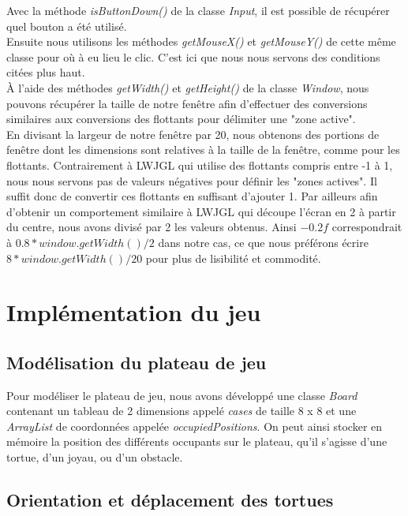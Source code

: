 \documentclass{article}
\begin{document}
Avec la méthode \textit{isButtonDown()} de la classe \textit{Input}, il est possible de récupérer quel bouton a été utilisé. \\

Ensuite nous utilisons les méthodes \textit{getMouseX()} et \textit{getMouseY()} de cette même classe pour où à eu lieu le clic. C'est ici que nous nous servons des conditions citées plus haut. \\

À l'aide des méthodes \textit{getWidth()} et \textit{getHeight()} de la classe \textit{Window}, nous pouvons récupérer la taille de notre fenêtre afin d'effectuer des conversions similaires aux conversions des flottants pour délimiter une "zone active".  \\

En divisant la largeur de notre fenêtre par 20, nous obtenons des portions de fenêtre dont les dimensions sont relatives à la taille de la fenêtre, comme pour les flottants. Contrairement à LWJGL qui utilise des flottants compris entre -1 à 1, nous nous servons pas de valeurs négatives pour définir les "zones actives".  Il suffit donc de convertir ces flottants en suffisant d'ajouter 1. Par ailleurs afin d'obtenir un comportement similaire à LWJGL qui découpe l'écran en 2 à partir du centre, nous avons divisé par 2 les valeurs obtenus. Ainsi $-0.2f$ correspondrait à $0.8*window.getWidth()/2$ dans notre cas, ce que nous préférons écrire $8*window.getWidth()/20$ pour plus de lisibilité et commodité.

\newpage

\section{Implémentation du jeu}
	\label{sec:game}
	\subsection{Modélisation du plateau de jeu}
\indent Pour modéliser le plateau de jeu, nous avons développé une classe \textit{Board} contenant un tableau de 2 dimensions appelé \textit{cases} de taille \(8\) x \(8\) et une \textit{ArrayList} de coordonnées appelée \textit{occupiedPositions}. On peut ainsi stocker en mémoire la position des différents occupants sur le plateau, qu'il s'agisse d'une tortue, d'un joyau, ou d'un obstacle.

	\subsection{Orientation et déplacement des tortues}
	
\end{document}
